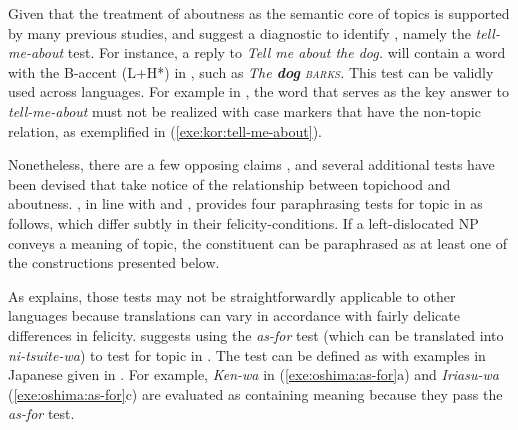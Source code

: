 Given that the treatment of aboutness as the semantic core of topics
is supported by many previous studies, \citet{reinhart:81} and
\citet{choi:99} suggest a diagnostic to identify , namely the
\textit{tell-me-about} test. For
instance, a reply to \textit{Tell me about the dog.} will contain a
word with the B-accent (L+H*) in , such as \textit{The
  \textbf{dog} \textsc{barks}.}  This test can be validly used across
languages. For example in , the word that
serves as the key answer to \textit{tell-me-about} must not be
realized with case markers that have the non-topic relation, as
exemplified in (\ref{exe:kor:tell-me-about}).




Nonetheless, there are a few opposing claims \citep{vermeulen:09}, and
several additional tests have been devised that take notice of the
relationship between topichood and aboutness.  \citet{roberts:11}, in
line with \citet{reinhart:81} and \citet{gundel:85}, provides four
paraphrasing tests for topic in  as follows, which differ
subtly in their felicity-conditions. If a
left-dislocated NP conveys a meaning of topic, the constituent can be
paraphrased as at least one of the constructions presented below.




\noindent As \citet{roberts:11} explains, those tests may not be
straightforwardly applicable to other languages because translations
can vary in accordance with fairly delicate differences in felicity.
\citet{oshima:09} suggests using the \textit{as-for} test (which can
be translated into \textit{ni-tsuite-wa}) to test for topic in
. The test can be defined as  with
examples in Japanese given in . For example,
\textit{Ken-wa} in (\ref{exe:oshima:as-for}a) and \textit{Iriasu-wa}
(\ref{exe:oshima:as-for}c) are evaluated as containing  meaning
because they pass the \textit{as-for} test.

